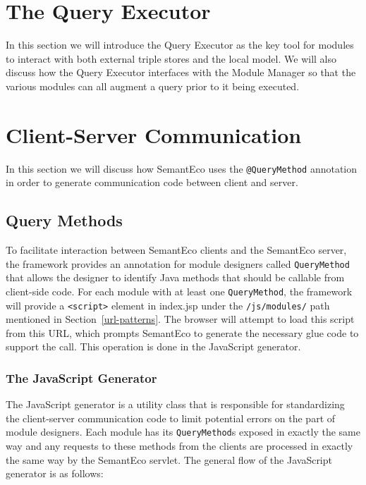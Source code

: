 \documentclass[letterpaper]{report}
\begin{document}
\section{The Query Executor}
\label{query-executor}
In this section we will introduce the Query Executor as the key tool for modules to interact with both external triple stores and the local model. We will also discuss how the Query Executor interfaces with the Module Manager so that the various modules can all augment a query prior to it being executed.

\section{Client-Server Communication}
\label{client-server-comm}
In this section we will discuss how SemantEco uses the \texttt{@QueryMethod} annotation in order to generate communication code between client and server. 

\subsection{Query Methods}
To facilitate interaction between SemantEco clients and the SemantEco server, the framework provides an annotation for module designers called \texttt{QueryMethod} that allows the designer to identify Java methods that should be callable from client-side code. For each module with at least one \texttt{QueryMethod}, the framework will provide a \texttt{<script>} element in index.jsp under the \texttt{/js/modules/} path mentioned in Section~\ref{url-patterns}. The browser will attempt to load this script from this URL, which prompts SemantEco to generate the necessary glue code to support the call. This operation is done in the JavaScript generator.

\subsubsection{The JavaScript Generator}
The JavaScript generator is a utility class that is responsible for standardizing the client-server communication code to limit potential errors on the part of module designers. Each module has its \texttt{QueryMethod}s exposed in exactly the same way and any requests to these methods from the clients are processed in exactly the same way by the SemantEco servlet. The general flow of the JavaScript generator is as follows:
\end{document}
